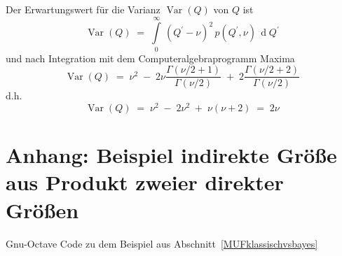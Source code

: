 Der Erwartungswert für die Varianz $\operatorname{Var}(Q)$ von $Q$ ist
\begin{equation}
\operatorname{Var}(Q) \; = \; \int\limits_{0}^{\infty} \, (Q^\prime
- \nu)^2 \, p(Q^\prime,\nu) \,
\operatorname{d}Q^\prime
\end{equation}
und nach Integration mit dem Computeralgebraprogramm Maxima
\begin{equation}
\operatorname{Var}(Q) \; = \; \nu^2 \; - \;
2 \nu \frac{\Gamma(\nu/2 + 1)}{\Gamma(\nu/2)} \; + \;
2 \frac{\Gamma(\nu/2 + 2)}{\Gamma(\nu/2)}
\end{equation}
d.h.
\begin{equation}
\operatorname{Var}(Q) \; = \; \nu^2 \; - \; 2 \nu^2 \; + \; \nu (\nu+2) \; = \; 2 \nu
\end{equation}

\newpage

\section{Anhang: Beispiel indirekte Größe aus Produkt zweier direkter Größen}
\label{AnhangBayesBeispiel}
Gnu-Octave Code zu dem Beispiel aus Abschnitt~\ref{MUFklassischvsbayes}


